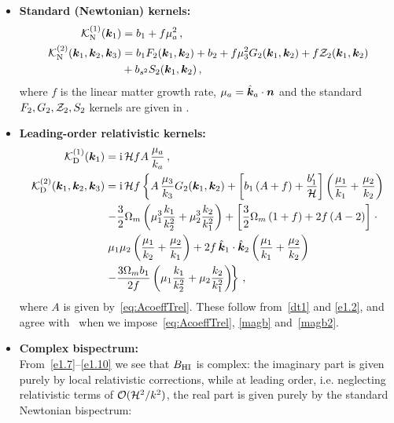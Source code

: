 \begin{itemize}
\item
{\bfseries Standard (Newtonian) kernels:}
\begin{align}
\mathcal{K}^{(1)}_\mathrm{N}(\bm {k}_1) &= b_1 + f\mu_{a}^{2}\,,  \label{e1.7} \\ 
\mathcal{K}^{(2)}_\mathrm{N}(\bm {k}_1,\bm {k}_2,\bm {k}_3) &= b_1 F_2(\bm {k}_1,\bm {k}_2) + b_2 + f\mu_{3}^{2} G_2(\bm {k}_1,\bm {k}_2) + f \mathcal{Z}_2(\bm {k}_1,\bm {k}_2) \nonumber \\
& + b_{s^{2}}S_{2}(\bm {k}_1,\bm {k}_2)\,, \label{e1.8}
\end{align}
where $f$ is the linear matter growth rate, $\mu_a=\hat{\bm {k}}_a\cdot\bm {n}$ and the standard $F_2,G_2,\mathcal{Z}_2,S_2$ kernels are given in \cite{Maartens:2019yhx}.

\item
{\bfseries Leading-order relativistic kernels:} 
\begin{align}
\mathcal{K}^{(1)}_{\mathrm{D}}(\bm {k}_1) &= \mathrm{i\,} \mathcal{H} f A\,\frac{\mu_{a}}{k_{a}}\,, \label{e1.9} \\
\mathcal{K}^{(2)}_{\mathrm{D}}(\bm {k}_1,\bm {k}_2,\bm {k}_3) &= \mathrm{i\,} \mathcal{H} f \left\{
A\,\frac{\mu_{3}}{k_{3}} G_{2}(\bm {k}_1,\bm {k}_2)
+{\left[ b_1\left( A+f \right) + \frac{b_1'}{\mathcal{H}} \right]}\left(\frac{\mu_{1}}{k_{1}} + \frac{\mu_{2}}{k_{2}}\right) \right.
\nonumber \\
& \left. -\frac{3}{2}\Omega_m \left(\mu_{1}^{3} \frac{k_{1}}{k_{2}^{2}} + \mu_{2}^{3}\frac{k_{2}}{k_{1}^{2}}\right)
+ \left[\frac{3}{2}\Omega_m \left(1+f \right)+2f\left(A-2\right) \right] \right. \cdot \\
& \left. \mu_{1}\mu_{2}\left(\frac{\mu_{1}}{k_{2}}+\frac{\mu_{2}}{k_{1}}\right) + 2 f \,  {\hat{\bm{k}}_{1} \cdot \hat{\bm{k}}_2}\left(\frac{\mu_{1}}{k_{1}} + \frac{\mu_{2}}{k_{2}}\right) \right. \nonumber \\
&\left. -\frac{3\Omega_m b_1}{2f} \left(\mu_{1}\frac{k_{1}}{k_{2}^{2}} + \mu_{2}\frac{k_{2}}{k_{1}^{2}}\right)\!  \right\}\,,\label{e1.10}
\end{align}
where $A$ is given by~\eqref{eq:AcoeffTrel}. These follow from~\eqref{dt1} and \eqref{e1.2}, and {agree with~\cite{Maartens:2019yhx} when we impose~\eqref{eq:AcoeffTrel}, \eqref{magb} and~\eqref{magb2}}.
\item
{\bfseries Complex bispectrum:}\\
From~\eqref{e1.7}--\eqref{e1.10} we see that
$B_{{\mathrm{HI}}}$ is complex: {the imaginary part is given purely by local relativistic corrections, while at leading order, i.e. neglecting relativistic terms of $\mathcal{O}(\mathcal{H}^2/k^2)$, the real part is given purely by the standard Newtonian bispectrum:}

\end{itemize}
